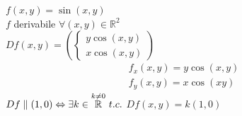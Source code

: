 \documentclass[a4paper, oneside]{article}
\begin{document}
        \begin{example}
            $f(x,y) = \sin(x,y)$\\
            $f$ derivabile $\forall (x,y) \in \mathbb{R}^2$\\
            $Df(x,y) = (\begin{cases*}
                y\cos(x,y)\\
                x\cos(x,y)
            \end{cases*})$
            \begin{gather*}
                f_x (x,y) = y\cos(x,y)\\
                f_y (x,y) = x\cos(xy)
            \end{gather*}
                $Df \parallel (1,0) \Leftrightarrow \exists k \in \overset{k \neq 0}{\mathbb{R}} \ t.c. \\$
                $Df (x,y) = k(1,0)$
        \end{example}
\end{document}
